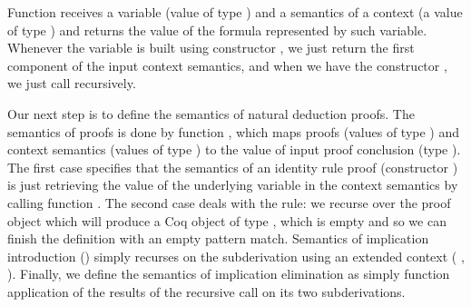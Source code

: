 Function  receives a variable (value of type   ) and a semantics
of a context (a value of type  ) and returns the value of the formula
represented by such variable. Whenever the variable is built using constructor ,
we just return the first component of the input context semantics, and when we have
the constructor , we just call  recursively.


Our next step is to define the semantics of natural deduction proofs. The semantics of
proofs is done by function , which maps proofs (values of type   )
and context semantics (values of type  ) to the value of input proof conclusion
(type  ). The first case specifies that the semantics of an identity rule proof
(constructor ) is just retrieving the value of the underlying variable in the context semantics
by calling function . The second case deals with the  rule: we recurse over the proof
object  which will produce a Coq object of type , which is empty and so we can finish the
definition with an empty pattern match. Semantics of implication introduction () simply
recurses on the subderivation  using an extended context ( , ). Finally, we define the
semantics of implication elimination as simply function application of the results of the
recursive call on its two subderivations.
